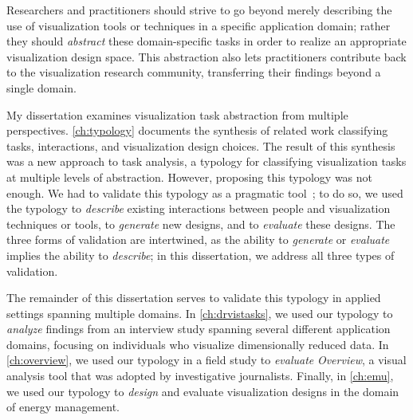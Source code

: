 Researchers and practitioners should strive to go beyond merely describing the use of visualization tools or techniques in a specific application domain; rather they should {\it abstract} these domain-specific tasks in order to realize an appropriate visualization design space.
This abstraction also lets practitioners contribute back to the visualization research community, transferring their findings beyond a single domain. 

My dissertation examines visualization task abstraction from multiple perspectives.
\autoref{ch:typology} documents the synthesis of related work classifying tasks, interactions, and visualization design choices.
The result of this synthesis was a new approach to task analysis, a typology for classifying visualization tasks at multiple levels of abstraction.
However, proposing this typology was not enough. 
We had to validate this typology as a pragmatic tool~\cite{Beaudouin-Lafon2004}; to do so, we used the typology to {\it describe} existing interactions between people and visualization techniques or tools, to {\it generate} new designs, and to {\it evaluate} these designs.
The three forms of validation are intertwined, as the ability to {\it generate} or {\it evaluate} implies the ability to {\it describe}; in this dissertation, we address all three types of validation.

The remainder of this dissertation serves to validate this typology in applied settings spanning multiple domains.
In \autoref{ch:drvistasks}, we used our typology to {\it analyze} findings from an interview study spanning several different application domains, focusing on individuals who visualize dimensionally reduced data.
In \autoref{ch:overview}, we used our typology in a field study to {\it evaluate} {\it Overview}, a visual analysis tool that was adopted by investigative journalists.
Finally, in \autoref{ch:emu}, we used our typology to {\it design} and evaluate visualization designs in the domain of energy management.

